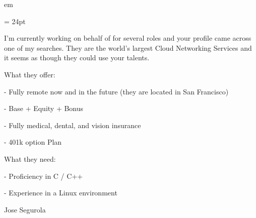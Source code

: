 

 em

  \FFrl \baselineskip = 24pt



I'm currently working on behalf of 
for several roles and your profile came across one of my searches. 
They are the world's largest Cloud Networking Services 
and it seems as though they could use your talents.

What they offer:

- Fully remote now and in the future (they are located in San Francisco)

- Base + Equity + Bonus

- Fully medical, dental, and vision insurance

- 401k option Plan

What they need:

- Proficiency in C / C++

- Experience in a Linux environment


Jose Segurola

\bye
